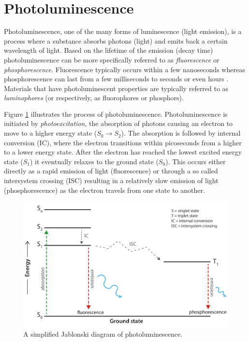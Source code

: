 \documentclass[thesis.tex]{subfiles}
\begin{document}
\section{Photoluminescence}
\label{section:photoluminescence}

Photoluminescence, one of the many forms of luminescence (light emission), is a process where a substance absorbs photons (light) and emits back a certain wavelength of light. Based on the lifetime of the emission (decay time) photoluminescence can be more specifically referred to as \emph{fluorescence} or \emph{phosphorescence}. Fluorescence typically occurs within a few nanoseconds whereas phosphorescence can last from a few milliseconds to seconds or even hours \cite{luminescence_basics}. Materials that have photoluminescent properties are typically referred to as \emph{luminophores} (or respectively, as fluorophores or phosphors).

Figure \ref{figure:photoluminescence} illustrates the process of photoluminescence. Photoluminescence is initiated by \emph{photoexcitation}, the absorption of photons causing an electron to move to a higher energy state ($S_0 \rightarrow S_2$). The absorption is followed by internal conversion (IC), where the electron transitions within picoseconds from a higher to a lower energy state. After the electron has reached the lowest excited energy state ($S_1$) it eventually relaxes to the ground state ($S_0$). This occurs either directly as a rapid emission of light (fluorescence) or through a so called intersystem crossing (ISC) resulting in a relatively slow emission of light (phosphorescence) as the electron travels from one state to another.

\begin{figure}[hb]
\centering \includegraphics[width=\textwidth]{images/photoluminescence.pdf}
\caption{A simplified Jablonski diagram of photoluminescence. \label{figure:photoluminescence}}
\end{figure}
\end{document}
